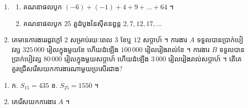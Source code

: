 \begin{pro}
\begin{enumerate}[1]
  \item \begin{enumerate}[a]
    \item គណនាផលបូក $(-6) + (-1) + 4 + 9 + \ldots + 64$ ។
    \item គណនាផលបូក $25$ តួដំបូងនៃស៊ីតនព្វន្ត $2, 7, 12, 17, \ldots$
  \end{enumerate}
  \item គេមានការងាររដូវក្តៅ $2$ សម្រាប់រយៈពេល $3$ ខែឬ $12$ សប្តាហ៍ ។ ការងារ $A$ ទទួលបានប្រាក់បៀវត្ស $325\,000$ រៀលក្នុងមួយខែ ហើយដំឡើង $100\,000$ រៀលរៀងរាល់ខែ ។ ការងារ $B$ ទទួលបានប្រាក់បៀវត្ស $80\,000$ រៀលក្នុងមួយសប្តាហ៍ ហើយដំឡើង $3\,000$ រៀលរៀងរាល់សប្តាហ៍ ។ តើគេគួរជ្រើសរើសយកការងារណាមួយប្រសើរជាង?
\end{enumerate}
\ans
\begin{enumerate}[1]
  \item ក. $S_{15} = 435$ \quad ខ. $S_{25} = 1550$ ។
  \item គេរើសយកការងារ $A$ ។
\end{enumerate}
\end{pro}

